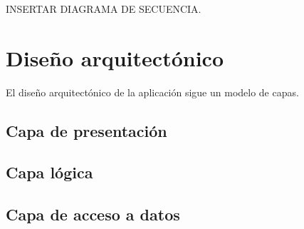 INSERTAR DIAGRAMA DE SECUENCIA.

\section{Diseño arquitectónico}

El diseño arquitectónico de la aplicación sigue un modelo de capas.

\subsection{Capa de presentación}

\subsection{Capa lógica}

\subsection{Capa de acceso a datos}

